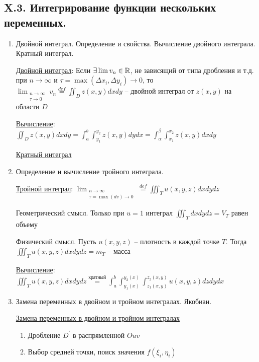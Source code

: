 \documentclass[12pt]{article}
\begin{document}
    \subsection{X.3. Интегрирование функции нескольких переменных.}

    \begin{enumerate}
        \item Двойной интеграл. Определение и свойства. Вычисление двойного интеграла. Кратный интеграл.

        \hyperlink{doubleintegral}{Двойной интеграл}: Если $\exists \lim v_n \in \mathbb{R}$, не зависящий от типа дробления и т.д. при $n \rightarrow \infty$ и
        $\tau = \max (\Delta x_i, \Delta y_i) \to 0$, то $\lim_{\substack{n\to\infty \\ \tau \to 0}} v_n \stackrel{def}{=} \iint_D z(x, y) dx dy$ -- двойной интеграл от $z(x, y)$ на области $D$

        \hyperlink{doubleintegralcalculation}{Вычисление}: $\iint_D z(x, y) dxdy = \int_a^b \int_{y_1}^{y_2} z(x, y) dydx = \int_\alpha^\beta \int_{x_1}^{x_2} z(x, y) dxdy$

        \hyperlink{multipleintegral}{Кратный интеграл}

        \item Определение и вычисление тройного интеграла.

        \hyperlink{tripleintegral}{Тройной интеграл}: $\lim_{\substack{n \to \infty \\ \tau = \max (dv) \to 0}} \stackrel{def}{=} \iiint_T u(x, y, z) dxdydz$

        Геометрический смысл. Только при $u = 1$ интеграл $\iiint_T dxdydz = V_T$ равен объему

        Физический смысл. Пусть $u(x, y, z)$ -- плотность в каждой точке $T$. Тогда $\iiint_T u(x, y, z) dxdydz = m_T$ -- масса

        \hyperlink{tripleintegralcalculation}{Вычисление}: $\iiint_T u(x, y, z) dxdydz \stackrel{\text{кратный}}{=} \int^b_a \int_{y_1(x)}^{y_2(x)} \int_{z_1(x, y)}^{z_2(x, y)} u(x, y, z) dz dy dx$


        \item Замена переменных в двойном и тройном интегралах. Якобиан.

        \hyperlink{substitutionindoubleintegral}{Замена переменных в двойном и тройном интегралах}

        \begin{enumerate}
            \item Дробление $D^\prime$ в распрямленной $Ouv$
            \item Выбор средней точки, поиск значения $f(\xi_i, \eta_i)$


\end{enumerate}
\end{enumerate}
\end{document}
